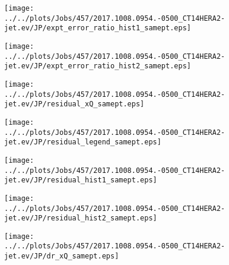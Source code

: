 \documentclass[12pt]{article}
\begin{document}
\begin{figure}
\texttt{[image: ../../plots/Jobs/457/2017.1008.0954.-0500\_CT14HERA2-jet.ev/JP/expt\_error\_ratio\_hist1\_samept.eps]}
\caption{}
\end{figure}\newpage\clearpage
\begin{figure}
\texttt{[image: ../../plots/Jobs/457/2017.1008.0954.-0500\_CT14HERA2-jet.ev/JP/expt\_error\_ratio\_hist2\_samept.eps]}
\caption{}
\end{figure}\newpage\clearpage
\begin{figure}
\texttt{[image: ../../plots/Jobs/457/2017.1008.0954.-0500\_CT14HERA2-jet.ev/JP/residual\_xQ\_samept.eps]}
\caption{}
\end{figure}\newpage\clearpage
\begin{figure}
\texttt{[image: ../../plots/Jobs/457/2017.1008.0954.-0500\_CT14HERA2-jet.ev/JP/residual\_legend\_samept.eps]}
\caption{}
\end{figure}\newpage\clearpage
\begin{figure}
\texttt{[image: ../../plots/Jobs/457/2017.1008.0954.-0500\_CT14HERA2-jet.ev/JP/residual\_hist1\_samept.eps]}
\caption{}
\end{figure}\newpage\clearpage
\begin{figure}
\texttt{[image: ../../plots/Jobs/457/2017.1008.0954.-0500\_CT14HERA2-jet.ev/JP/residual\_hist2\_samept.eps]}
\caption{}
\end{figure}\newpage\clearpage
\begin{figure}
\texttt{[image: ../../plots/Jobs/457/2017.1008.0954.-0500\_CT14HERA2-jet.ev/JP/dr\_xQ\_samept.eps]}
\caption{}
\end{figure}\newpage\clearpage
\end{document}
